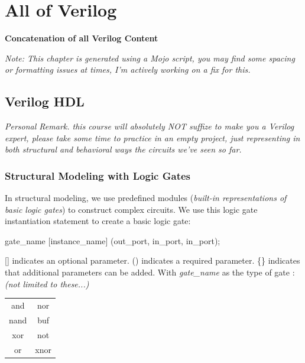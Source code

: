 \documentclass[12pt,openany]{book}
\begin{document}
\chapter{All of Verilog}
\label{Verilog}\begin{center}\vspace*{1cm}\begin{center}\textbf{Concatenation of all Verilog Content}\end{center} \newline \textit{Note: This chapter is generated using a Mojo script, you may find some spacing or formatting issues at times, I'm actively working on a fix for this.} \end{center}\newpage

\section{Verilog HDL}
					\textit{Personal Remark. this course will absolutely NOT suffize to make you a Verilog expert, please take some time to practice in an empty project, just representing in both structural and behavioral ways the circuits we've seen so far. }
			      	\subsection{Structural Modeling with Logic Gates}
			      	In structural modeling, we use predefined modules (\textit{built-in representations of basic logic gates}) to construct complex circuits.\newline
			      	\vspace{5px}
			      	We use this logic gate instantiation statement to create a basic logic gate:
\begin{vhdl}
gate_name [instance_name] (out_port, in_port{, in_port});
\end{vhdl}
			      	[] indicates an optional parameter.\newline
			      	()  indicates a required parameter. \newline
			      	\{\} indicates that additional parameters can be added. \newline
			      	\vspace*{10px}
			      	With \textit{gate\_name} as the type of gate :\newline
			      	\textit{(not limited to these...)}
			      	\begin{center}
			      		\begin{tabular}{|c|c|}
			      			\hline
			      			and  & nor  \\
			      			nand & buf  \\
			      			xor  & not  \\
			      			or   & xnor \\
			      			\hline
			      		\end{tabular}
			      	\end{center}
			      	
\end{document}
